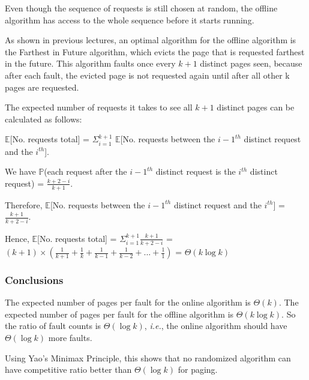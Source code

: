 \documentclass{article}
\begin{document}
Even though the sequence of requests is still chosen at random, the offline algorithm has access to the whole sequence before it starts running.

As shown in previous lectures, an optimal algorithm for the offline algorithm is the Farthest in Future algorithm, which evicts the page that is requested farthest in the future.  This algorithm faults once every $k+1$ distinct pages seen, because after each fault, the evicted page is not requested again until after all other k pages are requested.

The expected number of requests it takes to see all $k+1$ distinct pages can be calculated as follows:

$\mathbb{E}$[No. requests total] = $\Sigma_{i=1}^{k+1}$ $\mathbb{E}$[No. requests between the $i-1^{th}$ distinct request and the $i^{th}$].

We have $\mathbb{P}$(each request after the $i-1^{th}$ distinct request is the $i^{th}$ distinct request) = $\frac{k+2-i}{k+1}$. 

Therefore, $\mathbb{E}$[No. requests between the $i-1^{th}$ distinct request and the $i^{th}$] = $\frac{k+1}{k+2-i}$. 

Hence, $\mathbb{E}$[No. requests total] = $\Sigma_{i=1}^{k+1} \frac{k+1}{k+2-i}$ = $(k+1)\times(\frac{1}{k+1}+\frac{1}{k}+\frac{1}{k-1}+\frac{1}{k-2}+...+\frac{1}{1})$ = $\Theta(k\log k)$

\subsubsection{Conclusions}

The expected number of pages per fault for the online algorithm is $\Theta(k)$.  The expected number of pages per fault for the offline algorithm is $\Theta(k\log k)$.  So the ratio of fault counts is $\Theta(\log k)$, \emph{i.e.}, the online algorithm should have $\Theta(\log k)$ more faults.

Using Yao's Minimax Principle, this shows that no randomized algorithm can have competitive ratio better than $\Theta(\log k)$ for paging.
\end{document}
